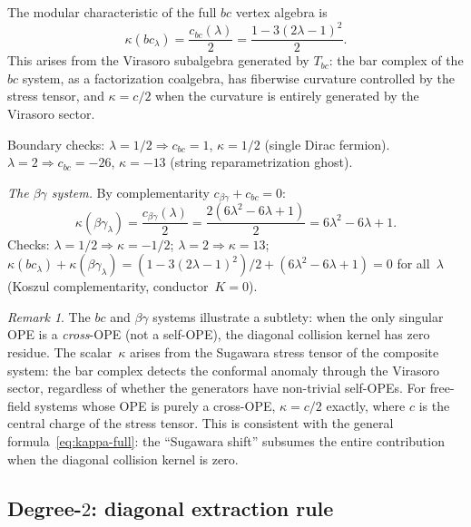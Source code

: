 \documentclass[11pt,reqno]{amsart}
\theoremstyle{definition}
\theoremstyle{remark}
\newtheorem{remark}[theorem]{Remark}
\numberwithin{equation}{section}
\begin{document}
The modular characteristic of the full $bc$ vertex algebra is
\begin{equation}\label{eq:kappa-bc}
\kappa(bc_\lambda) = \frac{c_{bc}(\lambda)}{2}
= \frac{1 - 3(2\lambda-1)^2}{2}.
\end{equation}
This arises from the Virasoro subalgebra generated by
$T_{bc}$: the bar complex of the $bc$ system, as a
factorization coalgebra, has fiberwise curvature controlled by
the stress tensor, and $\kappa = c/2$ when the curvature is
entirely generated by the Virasoro sector.

Boundary checks:
$\lambda = 1/2 \Rightarrow c_{bc} = 1$,
$\kappa = 1/2$ (single Dirac fermion).
$\lambda = 2 \Rightarrow c_{bc} = -26$,
$\kappa = -13$ (string reparametrization ghost).

\medskip\noindent
\emph{The $\beta\gamma$ system.}
By complementarity $c_{\beta\gamma} + c_{bc} = 0$:
\begin{equation}\label{eq:kappa-bg}
\kappa(\beta\gamma_\lambda) = \frac{c_{\beta\gamma}(\lambda)}{2}
= \frac{2(6\lambda^2-6\lambda+1)}{2}
= 6\lambda^2-6\lambda+1.
\end{equation}
Checks: $\lambda = 1/2 \Rightarrow \kappa = -1/2$;
$\lambda = 2 \Rightarrow \kappa = 13$;
$\kappa(bc_\lambda) + \kappa(\beta\gamma_\lambda)
= (1-3(2\lambda-1)^2)/2 + (6\lambda^2-6\lambda+1) = 0$
for all~$\lambda$ (Koszul complementarity, conductor~$K = 0$).

\begin{remark}\label{rem:bc-r-matrix}
The $bc$ and $\beta\gamma$ systems illustrate a subtlety: when
the only singular OPE is a \emph{cross}-OPE (not a self-OPE),
the diagonal collision kernel has zero residue.  The scalar~$\kappa$
arises from the Sugawara stress tensor of the
composite system: the bar complex detects the conformal anomaly
through the Virasoro sector, regardless of whether the
generators have non-trivial self-OPEs. For free-field systems
whose OPE is purely a cross-OPE, $\kappa = c/2$ exactly, where
$c$ is the central charge of the stress tensor. This is
consistent with the general formula~\eqref{eq:kappa-full}:
the ``Sugawara shift'' subsumes the entire contribution when
the diagonal collision kernel is zero.
\end{remark}

\subsection{Degree-$2$: diagonal extraction rule}
\label{subsec:kappa-general}
\end{document}
